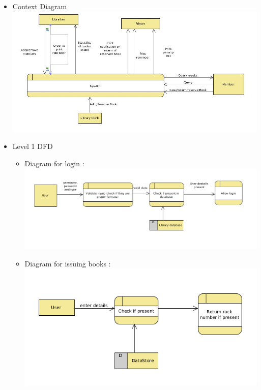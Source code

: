 \documentclass{article}
\begin{document}
\begin{itemize}
\item Context Diagram\\
\includegraphics[scale=0.5]{images/contextDiag.jpg}
\item Level 1 DFD\\
\begin{itemize}
\item Diagram for login : \\
\includegraphics[scale=0.5]{images/dfdDiagLogin.png}\\
\item Diagram for issuing books : \\ \includegraphics[scale=0.5]{images/DFDDiagIssue.png}\\

\end{itemize}
\end{itemize}
\end{document}
